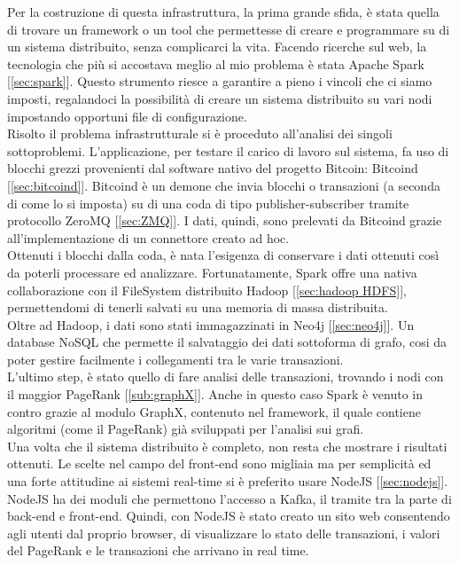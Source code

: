 Per la costruzione di questa infrastruttura, la prima grande sfida, è stata quella di trovare un framework o un tool che permettesse di creare e programmare su di un sistema distribuito, senza complicarci la vita. Facendo ricerche sul web, la tecnologia che più si accostava meglio al mio problema è stata Apache Spark [\ref{sec:spark}]. Questo strumento riesce a garantire a pieno i vincoli che ci siamo imposti, regalandoci la possibilità di creare un sistema distribuito su vari nodi impostando opportuni file di configurazione.
\\Risolto il problema infrastrutturale si è proceduto all'analisi dei singoli sottoproblemi. L'applicazione, per testare il carico di lavoro sul sistema, fa uso di blocchi grezzi provenienti dal software nativo del progetto Bitcoin: Bitcoind [\ref{sec:bitcoind}]. Bitcoind è un demone che invia blocchi o transazioni (a seconda di come lo si imposta) su di una coda di tipo publisher-subscriber tramite protocollo ZeroMQ [\ref{sec:ZMQ}]. I dati, quindi, sono prelevati da Bitcoind grazie all'implementazione di un connettore creato ad hoc.
\\Ottenuti i blocchi dalla coda, è nata l'esigenza di conservare i dati ottenuti così da poterli processare ed analizzare. Fortunatamente, Spark offre una nativa collaborazione con il FileSystem distribuito Hadoop [\ref{sec:hadoop HDFS}], permettendomi di tenerli salvati su una memoria di massa distribuita.
\\Oltre ad Hadoop, i dati sono stati immagazzinati in Neo4j [\ref{sec:neo4j}]. Un database NoSQL che permette il salvataggio dei dati sottoforma di grafo, cosi da poter gestire facilmente i collegamenti tra le varie transazioni.
\\L'ultimo step, è stato quello di fare analisi delle transazioni, trovando i nodi con il maggior PageRank [\ref{sub:graphX}]. Anche in questo caso Spark è venuto in contro grazie al modulo GraphX, contenuto nel framework, il quale contiene algoritmi (come il PageRank) già sviluppati per l'analisi sui grafi.  
\\Una volta che il sistema distribuito è completo, non resta che mostrare i risultati ottenuti. Le scelte nel campo del front-end sono migliaia ma per semplicità ed una forte attitudine ai sistemi real-time si è preferito usare NodeJS [\ref{sec:nodejs}]. NodeJS ha dei moduli che permettono l'accesso a Kafka, il tramite tra la parte di back-end e front-end. Quindi, con NodeJS è stato creato un sito web consentendo agli utenti dal proprio browser, di visualizzare lo stato delle transazioni, i valori del PageRank e le transazioni che arrivano in real time.






